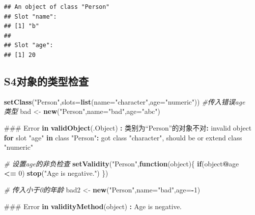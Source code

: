 \documentclass[]{book}
\newenvironment{Shaded}{\begin{snugshade}}{\end{snugshade}}
\newcommand{\KeywordTok}[1]{\textcolor[rgb]{0.13,0.29,0.53}{\textbf{#1}}}
\newcommand{\DataTypeTok}[1]{\textcolor[rgb]{0.13,0.29,0.53}{#1}}
\newcommand{\DecValTok}[1]{\textcolor[rgb]{0.00,0.00,0.81}{#1}}
\newcommand{\StringTok}[1]{\textcolor[rgb]{0.31,0.60,0.02}{#1}}
\newcommand{\CommentTok}[1]{\textcolor[rgb]{0.56,0.35,0.01}{\textit{#1}}}
\newcommand{\ControlFlowTok}[1]{\textcolor[rgb]{0.13,0.29,0.53}{\textbf{#1}}}
\newcommand{\OperatorTok}[1]{\textcolor[rgb]{0.81,0.36,0.00}{\textbf{#1}}}
\newcommand{\NormalTok}[1]{#1}
\begin{document}
\begin{verbatim}
## An object of class "Person"
## Slot "name":
## [1] "b"
## 
## Slot "age":
## [1] 20
\end{verbatim}

\subsection{S4对象的类型检查}\label{s4}

\begin{Shaded}
\begin{Highlighting}[]
\KeywordTok{setClass}\NormalTok{(}\StringTok{"Person"}\NormalTok{,}\DataTypeTok{slots=}\KeywordTok{list}\NormalTok{(}\DataTypeTok{name=}\StringTok{"character"}\NormalTok{,}\DataTypeTok{age=}\StringTok{"numeric"}\NormalTok{))}
\CommentTok{#传入错误age类型}
\NormalTok{bad <-}\StringTok{ }\KeywordTok{new}\NormalTok{(}\StringTok{"Person"}\NormalTok{,}\DataTypeTok{name=}\StringTok{"bad"}\NormalTok{,}\DataTypeTok{age=}\StringTok{"abc"}\NormalTok{)}

\NormalTok{###}
\NormalTok{Error }\ControlFlowTok{in} \KeywordTok{validObject}\NormalTok{(.Object) }\OperatorTok{:}\StringTok{ }\NormalTok{类别为“Person”的对象不对}\OperatorTok{:}\StringTok{ }\NormalTok{invalid object }\ControlFlowTok{for}\NormalTok{ slot }\StringTok{"age"} \ControlFlowTok{in}\NormalTok{ class }\StringTok{"Person"}\OperatorTok{:}\StringTok{ }\NormalTok{got class }\StringTok{"character"}\NormalTok{, should be or extend class }\StringTok{"numeric"}       
\end{Highlighting}
\end{Shaded}

\begin{Shaded}
\begin{Highlighting}[]
\CommentTok{# 设置age的非负检查}
\KeywordTok{setValidity}\NormalTok{(}\StringTok{"Person"}\NormalTok{,}\ControlFlowTok{function}\NormalTok{(object)\{}
  \ControlFlowTok{if}\NormalTok{(object}\OperatorTok{@}\NormalTok{age }\OperatorTok{<=}\StringTok{ }\DecValTok{0}\NormalTok{) }\KeywordTok{stop}\NormalTok{(}\StringTok{"Age is negative."}\NormalTok{)}
\NormalTok{\})}

\CommentTok{# 传入小于0的年龄}
\NormalTok{bad2 <-}\StringTok{ }\KeywordTok{new}\NormalTok{(}\StringTok{"Person"}\NormalTok{,}\DataTypeTok{name=}\StringTok{"bad"}\NormalTok{,}\DataTypeTok{age=}\OperatorTok{-}\DecValTok{1}\NormalTok{)}

\NormalTok{###}
\NormalTok{Error }\ControlFlowTok{in} \KeywordTok{validityMethod}\NormalTok{(object) }\OperatorTok{:}\StringTok{ }\NormalTok{Age is negative.}
\end{Highlighting}
\end{Shaded}
\end{document}
